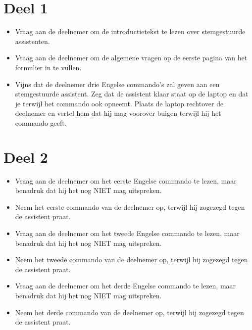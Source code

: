 \section{Deel 1}
\begin{itemize}
    \item Vraag aan de deelnemer om de introductietekst te lezen over stemgestuurde assistenten.
    \item Vraag aan de deelnemer om de algemene vragen op de eerste pagina van het formulier in te vullen.
    \item Vijns dat de deelnemer drie Engelse commando’s zal geven aan een stemgestuurde assistent. Zeg dat de assistent klaar staat op de laptop en dat je terwijl het commando ook opneemt. Plaats de laptop rechtover de deelnemer en vertel hem dat hij mag voorover buigen terwijl hij het commando geeft.
\end{itemize}

\section{Deel 2}
\begin{itemize}
    \item Vraag aan de deelnemer om het eerste Engelse commando te lezen, maar benadruk dat hij het nog NIET mag uitspreken.
    \item Neem het eerste commando van de deelnemer op, terwijl hij zogezegd tegen de assistent praat.
    \item Vraag aan de deelnemer om het tweede Engelse commando te lezen, maar benadruk dat hij het nog NIET mag uitspreken.
    \item Neem het tweede commando van de deelnemer op, terwijl hij zogezegd tegen de assistent praat.
    \item Vraag aan de deelnemer om het derde Engelse commando te lezen, maar benadruk dat hij het nog NIET mag uitspreken.
    \item Neem het derde commando van de deelnemer op, terwijl hij zogezegd tegen de assistent praat.
\end{itemize}

